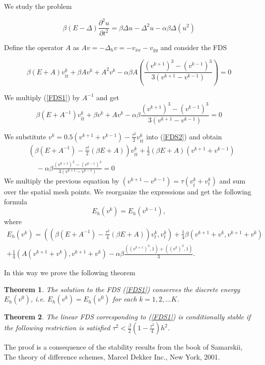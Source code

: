 \documentclass{article}
\newcommand{\be}{\begin{equation}}
\newcommand{\ee}{\end{equation}}
\newcommand{\rf}[1]{(\ref{#1})}
\newtheorem{thm}{Theorem}
\begin{document}
We study the problem

\be\label{problem}
\beta(E-\Delta) \frac{\partial^2 u}{\partial t^2}=
 \beta \Delta u -\Delta^2 u -\alpha \beta \Delta (u^2)
\ee


Define the operator $A$ as $Av=-\Delta_h v=-v_{\bar{x}x} - v_{\bar{y}y}$ and consider the FDS

\be\label{FDS1}
\beta (E+A)v_{\bar{t}t}^k +\beta Av^k+A^2 v^k -\alpha \beta A\left(\frac{(v^{k+1})^3-(v^{k-1})^3}{3(v^{k+1}-v^{k-1})} \right)=0
\ee

We multiply \rf{FDS1} by $A^{-1}$ and get 
\be\label{FDS2}
\beta (E+A^{-1})v_{\bar{t}t}^k +\beta v^k+A v^k -\alpha \beta \frac{(v^{k+1})^3-(v^{k-1})^3}{3(v^{k+1}-v^{k-1})} =0
\ee

We substitute $v^{k}=0.5(v^{k+1}+v^{k-1})-\frac{\tau^2}{2}v_{\bar{t}t}^k$ into \rf{FDS2}
and obtain
\begin{align*}
&\left( \beta (E+A^{-1})- \frac{\tau^2}{2}(\beta E+A ) \right)v_{\bar{t}t}^k  + \frac{1}{2} (\beta E +A )(v^{k+1}+v^{k-1}) \\
&~~~~~-\alpha \beta \frac{(v^{k+1})^3-(v^{k-1})^3}{3(v^{k+1}-v^{k-1})} =0
\end{align*}
We multiply the previous equation by $(v^{k+1}-v^{k-1})=\tau (v_{\bar{t}}^k + v_{t}^k)$ and sum over the spatial mesh points.
We reorganize the expressions and get the following formula 
\be\label{num_en}
E_h(v^k) =E_h(v^{k-1}),
\ee
where
\begin{align*}
E_h(v^k)=\left( \left( \beta (E+A^{-1})- \frac{\tau^2}{4}(\beta E+A ) \right)v_{t}^k ,v_{t}^k \right)+\frac{1}{4} \beta \left(  v^{k+1}+v^{k}, v^{k+1}+v^{k} \right) \\
+\frac{1}{4}  \left(  A(v^{k+1}+v^{k}), v^{k+1}+v^{k} \right)
-\alpha \beta \frac{((v^{k+1})^3,1)+((v^{k})^3,1)}{3}.
\end{align*}

In this way we prove the following theorem
\begin{thm}
The solution to the FDS \rf{FDS1} conserves the discrete energy
 $E_h(v^0)$, i.e.  $E_h(v^k) =E_h(v^{0})$ for each $k=1,2,...K$.
\end{thm}

\begin{thm}
The linear FDS corresponding to \rf{FDS1} is conditionally stable if
the following restriction is satisfied
$\tau^2 < \frac{\beta}{2}(1-\frac{\tau^2}{4}) h^2$.

\end{thm}
The proof is a consequence of the stability results from the book of
 Samarskii,  The theory of difference schemes, Marcel Dekker Inc., New York, 2001.
\end{document}
